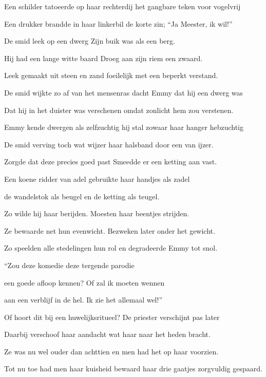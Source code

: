 Een schilder tatoeerde op haar rechterdij
het gangbare teken voor vogelvrij

Een drukker brandde in haar linkerbil
de korte zin; “Ja Meester, ik wil!”

De smid leek op een dwerg
Zijn buik was als een berg.

Hij had een lange witte baard
Droeg aan zijn riem een zwaard.

Leek gemaakt uit steen en zand
foeilelijk met een beperkt verstand.

De smid wijkte zo af van het mensenras
dacht Emmy dat hij een dwerg was

Dat hij in het duister was verschenen
omdat zonlicht hem zou verstenen.

Emmy kende dwergen als zelfzuchtig
hij stal zowaar haar hanger hebzuchtig

De smid verving toch wat wijzer
haar halsband door een van ijzer.

Zorgde dat deze precies goed past
Smeedde er een ketting aan vast.

Een koene ridder van adel
gebruikte haar handjes als zadel

de wandelstok als beugel
en de ketting als teugel.

Zo wilde hij haar berijden.
Moesten haar beentjes strijden.

Ze bewaarde net hun evenwicht.
Bezweken later onder het gewicht.

Zo speelden alle stedelingen hun rol
en degradeerde Emmy tot snol.

“Zou deze komedie
deze tergende parodie

een goede afloop kennen?
Of zal ik moeten wennen

aan een verblijf in de hel.
Ik zie het allemaal wel!”

Of hoort dit bij een huwelijksritueel?
De priester verschijnt pas later

Daarbij verschoof haar aandacht
wat haar naar het heden bracht.

Ze was nu wel ouder dan achttien
en men had het op haar voorzien.

Tot nu toe had men haar kuisheid bewaard
haar drie gaatjes zorgvuldig gespaard.
